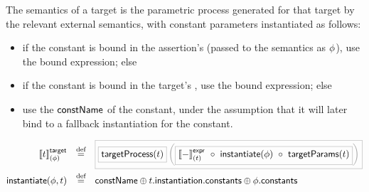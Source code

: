 \begin{defn}[\mtarget]

The semantics of a target is the parametric process generated for that
target by the relevant external semantics, with constant parameters instantiated
as follows:

\begin{itemize}
\item
	if the constant is bound in the assertion's \mtargetinstantiation{}
	(passed to the semantics as \(\phi\)), use the bound expression; else
\item
	if the constant is bound in the target's \mtargetinstantiation, use
	the bound expression; else
\item
	use the \(\mathsf{constName}\) of the constant, under the assumption
	that it will later bind to a fallback instantiation for the constant.
\end{itemize}
%
\begin{align*}
	\targetsema{\atarget}{\aninst}
\quad\defeq\quad&
\tlang{
	\olang{\funcname{targetProcess}(\atarget)}
	\left(
		\olang{\exprsema{-}{\atarget}\ \circ\ \funcname{instantiate}(\aninst)\ \circ\ \funcname{targetParams}(\atarget)}
	\right)
}
\\
	\funcname{instantiate}(\aninst, \atarget)
\quad\defeq\quad&
	\funcname{constName}
	\oplus
	\field{\field{\atarget}{instantiation}}{constants}
	\oplus
	\field{\aninst}{constants}
\end{align*}
\end{defn}


